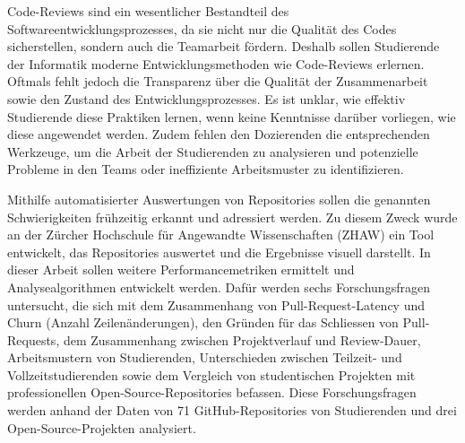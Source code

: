 \begin{extraAbstract}
\addchaptertocentry{\extraabstractname} %
Code-Reviews sind ein wesentlicher Bestandteil des Softwareentwicklungsprozesses, da sie nicht nur die Qualität des Codes sicherstellen, sondern auch die Teamarbeit fördern. Deshalb sollen 
Studierende der Informatik moderne Entwicklungsmethoden wie Code-Reviews erlernen.  Oftmals fehlt jedoch die Transparenz über die Qualität der Zusammenarbeit sowie den Zustand des Entwicklungsprozesses.
Es ist unklar, wie effektiv Studierende diese Praktiken lernen, wenn keine Kenntnisse darüber vorliegen, wie diese angewendet werden. Zudem fehlen den Dozierenden die entsprechenden Werkzeuge, um die Arbeit der Studierenden zu analysieren und potenzielle Probleme in den Teams oder ineffiziente Arbeitsmuster zu identifizieren.

Mithilfe automatisierter Auswertungen von Repositories sollen die genannten \linebreak Schwierigkeiten frühzeitig erkannt und adressiert werden. Zu diesem Zweck wurde an der Zürcher Hochschule für Angewandte Wissenschaften (ZHAW) ein Tool entwickelt, das Repositories auswertet und die Ergebnisse visuell darstellt. In dieser Arbeit sollen weitere Performancemetriken ermittelt und Analysealgorithmen entwickelt werden. Dafür werden sechs Forschungsfragen untersucht, die sich mit dem Zusammenhang von Pull-Request-Latency und Churn (Anzahl Zeilenänderungen), den Gründen für das Schliessen von Pull-Requests, dem Zusammenhang zwischen Projektverlauf und Review-Dauer, Arbeitsmustern von Studierenden, Unterschieden zwischen Teilzeit- und Vollzeitstudierenden sowie dem Vergleich von studentischen Projekten mit professionellen Open-Source-Repositories befassen. Diese Forschungsfragen werden anhand der Daten von 71 GitHub-Repositories von Studierenden und drei Open-Source-Projekten analysiert.


\end{extraAbstract}
